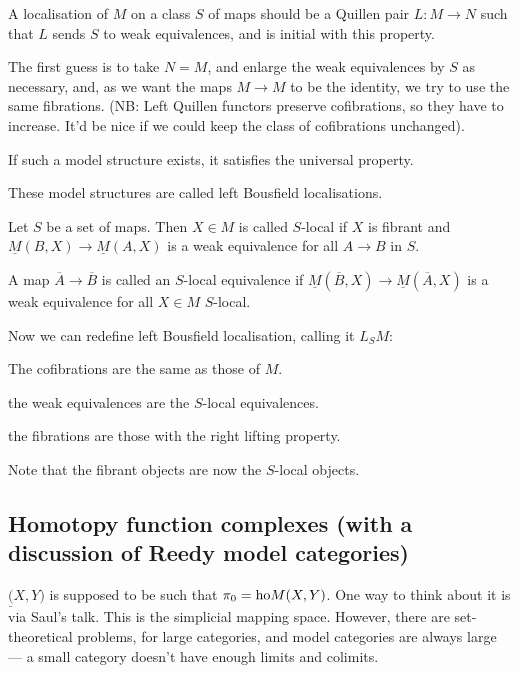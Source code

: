 \documentclass[11pt]{article}
\begin{document}
\begin{AlexandreBousfieldLocalisation}
\begin{PartOne}
\begin{defn*}
A localisation of $M$ on a class $S$ of maps should be a Quillen pair $L:M\to N$ such that $L$ sends $S$ to weak equivalences, and is initial with this property.
\end{defn*}
The first guess is to take $N=M$, and enlarge the weak equivalences by $S$ as necessary,  and, as we want the maps $M\to M$ to be the identity, we try to use the same fibrations. (NB: Left Quillen functors preserve cofibrations, so they have to increase. It'd be nice if we could keep the class of cofibrations unchanged).
\begin{prop*}
If such a model structure exists, it satisfies the universal property.
\end{prop*}
\begin{defn*}
These model structures are called left Bousfield localisations.
\end{defn*}
\begin{defn*}
Let $S$ be a set of maps. Then $X\in M$ is called $S$-local if $X$ is fibrant and $\underline M(B,X)\to\underline M(A,X)$ is a weak equivalence for all $A\to B$ in $S$.
\end{defn*}
\begin{defn*}
A map $\overline A\to\overline B$ is called an $S$-local equivalence if $\underline M(\overline B,X)\to\underline M(\overline A,X)$ is a weak equivalence for all $X\in M$ $S$-local.
\end{defn*}
Now we can redefine left Bousfield localisation, calling it $L_SM$:
\begin{itemise}
\item The cofibrations are the same as those of $M$.
\item the weak equivalences are the $S$-local equivalences.
\item the fibrations are those with the right lifting property.
\item Note that the fibrant objects are now the $S$-local objects.
\end{itemise}
\subsection*{Homotopy function complexes (with a discussion of Reedy model categories)}
$\underline(X,Y)$ is supposed to be such that $\pi_0=\textup{ho} M(X,Y)$. One way to think about it is via Saul's talk. This is the simplicial mapping space. However, there are set-theoretical problems, for large categories, and model categories are always large --- a small category doesn't have enough limits and colimits.


\end{PartOne}
\end{AlexandreBousfieldLocalisation}
\end{document}
